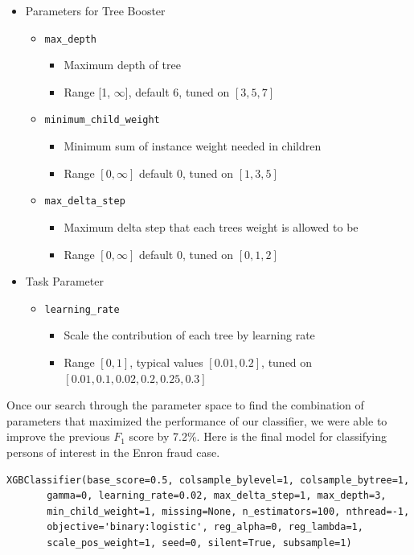 \documentclass[twoside,openright,titlepage,numbers=noenddot,headinclude,%
               footinclude=true,cleardoublepage=empty,abstractoff,BCOR=5mm,%
               paper=a4,fontsize=11pt,ngerman,american]{scrreprt}
\numberwithin{theorem}{chapter}
\numberwithin{definition}{chapter}
\numberwithin{algorithm}{chapter}
\numberwithin{figure}{chapter}
\numberwithin{table}{chapter}
\numberwithin{equation}{chapter}
\begin{document}
\begin{itemize}
\item Parameters for Tree Booster
    \begin{itemize}
        \item \texttt{max\_depth}
        \begin{itemize}
            \item Maximum depth of tree
            \item Range [1, $\infty$], default 6, tuned on $[3,5,7]$
        \end{itemize}
        \item \texttt{minimum\_child\_weight}
        \begin{itemize}
            \item Minimum sum of instance weight needed in children
            \item Range $[0,\infty]$ default 0, tuned on $[1,3,5]$
        \end{itemize}
        \item \texttt{max\_delta\_step}
        \begin{itemize}
            \item Maximum delta step that each trees weight is allowed to be
            \item Range $[0, \infty]$ default 0, tuned on $[0, 1, 2]$
        \end{itemize}
    \end{itemize}

\item Task Parameter
    \begin{itemize}
        \item \texttt{learning\_rate}
        \begin{itemize}
            \item Scale the contribution of each tree by learning rate
            \item Range $[0, 1]$, typical values $[0.01, 0.2]$, tuned on $[0.01, 0.1, 0.02, 0.2, 0.25, 0.3]$
        \end{itemize}
    \end{itemize}

\end{itemize}

Once our search through the parameter space to find the combination of parameters that maximized the performance of our classifier, we were able to improve the previous $F_1$ score by 7.2\%. Here is the final model for classifying persons of interest in the Enron fraud case.
\begin{verbatim}
XGBClassifier(base_score=0.5, colsample_bylevel=1, colsample_bytree=1,
       gamma=0, learning_rate=0.02, max_delta_step=1, max_depth=3,
       min_child_weight=1, missing=None, n_estimators=100, nthread=-1,
       objective='binary:logistic', reg_alpha=0, reg_lambda=1,
       scale_pos_weight=1, seed=0, silent=True, subsample=1)
\end{verbatim}
\end{document}
